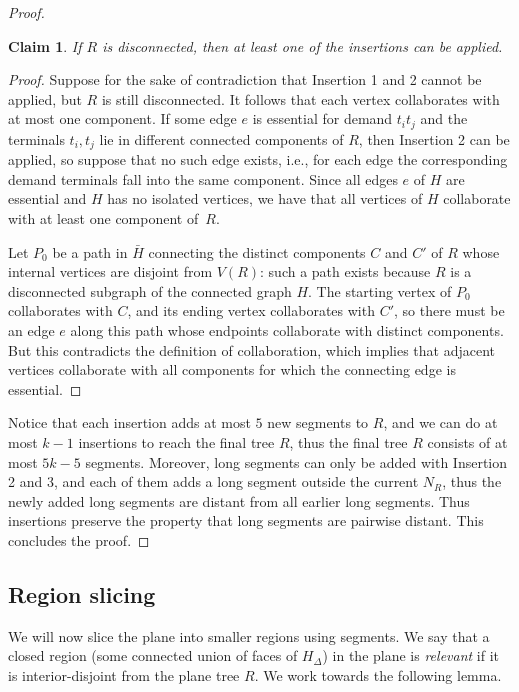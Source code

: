 \documentclass[a4paper,11pt]{article}
\theoremstyle{plain}
\newtheorem{claim}[theorem]{Claim}
\newtheorem{identification rule}{Identification Rule}
\theoremstyle{definition}
\theoremstyle{remark}
\newenvironment{claimproof}{\begin{proof}\renewcommand{\qedsymbol}{\claimqed}}{\end{proof}\renewcommand{\qedsymbol}{\plainqed}}
\let\plainqed\qedsymbol
\newcommand{\claimqed}{$\lrcorner$}
\begin{document}
\begin{proof}
\begin{claim}
If $R$ is disconnected, then at least one of the insertions can be applied.
\end{claim}
\begin{claimproof}
Suppose for the sake of contradiction that Insertion 1 and 2 cannot be applied, but $R$ is still disconnected. It follows that each vertex collaborates with at most one component. If some edge $e$ is essential for demand $t_it_j$ and the terminals $t_i,t_j$ lie in different connected components of $R$, then Insertion 2 can be applied, so suppose that no such edge exists, i.e., for each edge the corresponding demand terminals fall into the same component. Since all edges $e$ of $H$ are essential and $H$ has no isolated vertices, we have that all vertices of $H$ collaborate with at least one component of~$R$.

Let $P_0$ be a path in $\bar H$ connecting the distinct components $C$ and $C'$ of $R$ whose internal vertices are disjoint from $V(R)$: such a path exists because $R$ is a disconnected subgraph of the connected graph $H$. The starting vertex of $P_0$ collaborates with $C$, and its ending vertex collaborates with $C'$, so there must be an edge $e$ along this path whose endpoints collaborate with distinct components. But this contradicts the definition of collaboration, which implies that adjacent vertices collaborate with all components for which the connecting edge is essential.
\end{claimproof}

Notice that each insertion adds at most $5$ new segments to $R$, and we can do at most $k-1$ insertions to reach the final tree $R$, thus the final tree $R$ consists of at most $5k-5$ segments. Moreover, long segments can only be added with Insertion 2 and 3, and each of them adds a long segment outside the current $N_R$, thus the newly added long segments are distant from all earlier long segments. Thus insertions preserve the property that long segments are pairwise distant. This concludes the proof.
\end{proof}


\subsection{Region slicing}\label{sec:Sperner}

We will now slice the plane into smaller regions using segments. We say that a closed region (some connected union of faces of $H_\Delta$) in the plane is \emph{relevant} if it is interior-disjoint from the plane tree $R$.  We work towards the following lemma.
\end{document}
